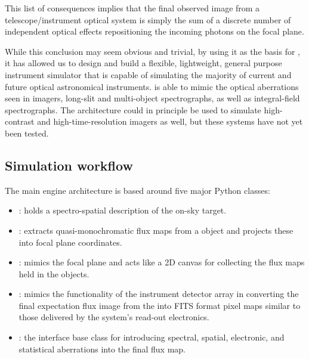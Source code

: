 This list of consequences implies that the final observed image from a
telescope/instrument optical system is simply the sum of a discrete
number of independent optical effects repositioning the incoming
photons on the focal plane.

While this conclusion may seem obvious and trivial, by using it as the
basis for \ScopeSim{}, it has allowed us to design and build a
flexible, lightweight, general purpose instrument simulator that is
capable of simulating the majority of current and future optical
astronomical instruments.  \ScopeSim{} is able to mimic the optical
aberrations seen in imagers, long-slit and multi-object spectrographs,
as well as integral-field spectrographs.  The architecture could in
principle be used to simulate high-contrast and high-time-resolution
imagers as well, but these systems have not yet been tested.


\subsection{Simulation workflow}
\label{simulation-workflow}

The main \ScopeSim{} engine architecture is based around five major
Python classes:

\begin{itemize}
\item \textbf{\Source{}}: holds a spectro-spatial description of the
  on-sky target.

\item \textbf{\FieldOfView{}}: extracts quasi-monochromatic flux maps
  from a \Source{} object and projects these into focal plane
  coordinates.

\item \textbf{\ImagePlane{}}: mimics the focal plane and acts like a
  2D canvas for collecting the flux maps held in the \FieldOfView{}
  objects.

\item \textbf{\DetectorArray}: mimics the functionality of the
  instrument detector array in converting the final expectation flux
  image from the \ImagePlane{} into FITS format pixel maps similar to
  those delivered by the system's read-out electronics.

\item \textbf{\Effect{}}: the interface base class for introducing
  spectral, spatial, electronic, and statistical aberrations into the
  final flux map.
\end{itemize}

